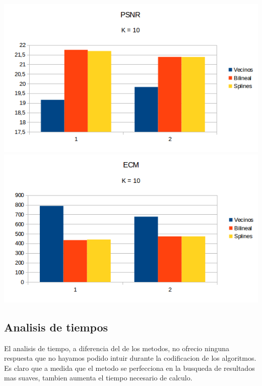 \begin{center}
\includegraphics[scale=0.50]{imagenes/K10PSNR.png}
\includegraphics[scale=0.50]{imagenes/K10ECM.png}
\end{center}

\subsection{Analisis de tiempos}
El analisis de tiempo, a diferencia del de los metodos, no ofrecio ninguna respuesta que no hayamos podido intuir durante la codificacion de los algoritmos. Es claro que a medida que el metodo se perfecciona en la busqueda de resultados mas suaves, tambien aumenta el tiempo necesario de calculo.


